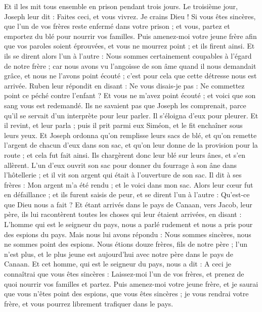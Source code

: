 \begin{multicols}{2}
Et il les mit tous ensemble en prison pendant trois jours.
Le troisième jour, Joseph leur dit : Faites ceci, et vous vivrez. Je crains Dieu !
Si vous êtes sincères, que l'un de vos frères reste enfermé dans votre prison ; et vous, partez et emportez du blé pour nourrir vos familles.
Puis amenez-moi votre jeune frère afin que vos paroles soient éprouvées, et vous ne mourrez point ; et ils firent ainsi.
Et ils se dirent alors l'un à l'autre : Nous sommes certainement coupables à l'égard de notre frère ; car nous avons vu l'angoisse de son âme quand il nous demandait grâce, et nous ne l'avons point écouté ; c'est pour cela que cette détresse nous est arrivée.
Ruben leur répondit en disant : Ne vous disais-je pas : Ne commettez point ce péché contre l'enfant ? Et vous ne m'avez point écouté ; et voici que son sang vous est redemandé.
Ils ne savaient pas que Joseph les comprenait, parce qu'il se servait d'un interprète pour leur parler.
Il s'éloigna d'eux pour pleurer. Et il revint, et leur parla ; puis il prit parmi eux Siméon, et le fit enchaîner sous leurs yeux.
Et Joseph ordonna qu'on remplisse leurs sacs de blé, et qu'on remette l'argent de chacun d'eux dans son sac, et qu'on leur donne de la provision pour la route ; et cela fut fait ainsi.
Ils chargèrent donc leur blé sur leurs ânes, et s'en allèrent.
L'un d'eux ouvrit son sac pour donner du fourrage à son âne dans l'hôtellerie ; et il vit son argent qui était à l'ouverture de son sac.
Il dit à ses frères : Mon argent m'a été rendu ; et le voici dans mon sac. Alors leur cœur fut en défaillance ; et ils furent saisis de peur, et se dirent l'un à l'autre : Qu'est-ce que Dieu nous a fait ?
Et étant arrivés dans le pays de Canaan, vers Jacob, leur père, ils lui racontèrent toutes les choses qui leur étaient arrivées, en disant :
L'homme qui est le seigneur du pays, nous a parlé rudement et nous a pris pour des espions du pays.
Mais nous lui avons répondu : Nous sommes sincères, nous ne sommes point des espions.
Nous étions douze frères, fils de notre père ; l'un n'est plus, et le plus jeune est aujourd'hui avec notre père dans le pays de Canaan.
Et cet homme, qui est le seigneur du pays, nous a dit : A ceci je connaîtrai que vous êtes sincères : Laissez-moi l'un de vos frères, et prenez de quoi nourrir vos familles et partez.
Puis amenez-moi votre jeune frère, et je saurai que vous n'êtes point des espions, que vous êtes sincères ; je vous rendrai votre frère, et vous pourrez librement trafiquer dans le pays.

\end{multicols}
